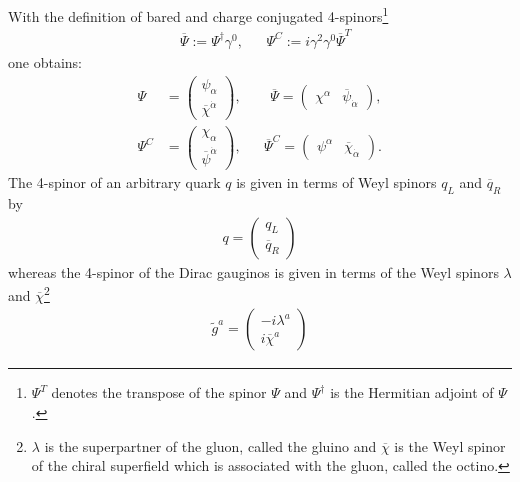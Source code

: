  
With the definition of bared and charge conjugated 4-spinors\footnote{$\Psi^T$ denotes the transpose of the spinor $\Psi$ and $\Psi^\dagger$ is the Hermitian adjoint of $\Psi$.}
\begin{align}
&\overline{\Psi} := \Psi^\dagger \gamma^0, && \Psi^C := i\gamma^2\gamma^0 \overline{\Psi}^T  
\end{align}
one obtains:
\begin{align}
\Psi &= \begin{pmatrix}
\psi_\alpha \\
\overline{\chi}^{\dot{\alpha}}
\end{pmatrix}, && \ \ 
\overline{\Psi} = \begin{pmatrix}
\chi^\alpha & \overline{\psi}_{\dot{\alpha}}
\end{pmatrix},\nonumber\\
\Psi^C &= \begin{pmatrix}
\chi_\alpha \\
\overline{\psi}^{\dot{\alpha}}
\end{pmatrix}, && 
\overline{\Psi}^C = \begin{pmatrix}
\psi^\alpha & \overline{\chi}_{\dot{\alpha}}
\end{pmatrix}.
\end{align}
The 4-spinor of an arbitrary quark $q$ is given in terms of Weyl spinors $q_L$ and $\overline{q}_R$ by
\begin{align}
q = \begin{pmatrix}
q_L \\
\overline{q}_R
\end{pmatrix}
\end{align}
whereas the 4-spinor of the Dirac gauginos is given in terms of the Weyl spinors $\lambda$ and $\overline{\chi}$\footnote{$\lambda$ is the superpartner of the gluon, called the gluino and $\overline{\chi}$ is the Weyl spinor of the chiral superfield which is associated with the gluon, called the octino.}
\begin{align}
\tilde{g}^a = \begin{pmatrix}
-i \lambda^a \\
i \overline{\chi}^a
\end{pmatrix}
\end{align}

